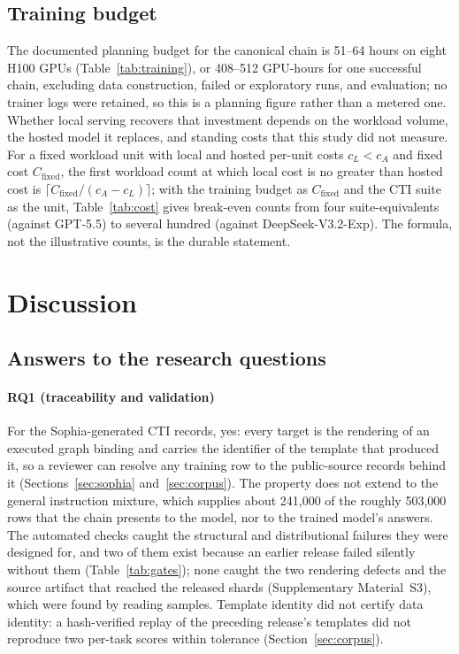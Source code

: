 \documentclass[a4paper,fleqn]{cas-dc}
\begin{document}
\subsection{Training budget}
The documented planning budget for the canonical chain is 51--64 hours on eight H100 GPUs (Table~\ref{tab:training}), or 408--512 GPU-hours for one successful chain, excluding data construction, failed or exploratory runs, and evaluation; no trainer logs were retained, so this is a planning figure rather than a metered one. Whether local serving recovers that investment depends on the workload volume, the hosted model it replaces, and standing costs that this study did not measure. For a fixed workload unit with local and hosted per-unit costs $c_L<c_A$ and fixed cost $C_{\mathrm{fixed}}$, the first workload count at which local cost is no greater than hosted cost is $\lceil C_{\mathrm{fixed}}/(c_A-c_L)\rceil$; with the training budget as $C_{\mathrm{fixed}}$ and the CTI suite as the unit, Table~\ref{tab:cost} gives break-even counts from four suite-equivalents (against GPT-5.5) to several hundred (against DeepSeek-V3.2-Exp). The formula, not the illustrative counts, is the durable statement.


\section{Discussion}\label{sec:discussion}
\subsection{Answers to the research questions}\label{sec:rqanswers}
\paragraph{RQ1 (traceability and validation)}
For the Sophia-generated CTI records, yes: every target is the rendering of an executed graph binding and carries the identifier of the template that produced it, so a reviewer can resolve any training row to the public-source records behind it (Sections~\ref{sec:sophia} and~\ref{sec:corpus}). The property does not extend to the general instruction mixture, which supplies about 241,000 of the roughly 503,000 rows that the chain presents to the model, nor to the trained model's answers. The automated checks caught the structural and distributional failures they were designed for, and two of them exist because an earlier release failed silently without them (Table~\ref{tab:gates}); none caught the two rendering defects and the source artifact that reached the released shards (Supplementary Material~S3), which were found by reading samples. Template identity did not certify data identity: a hash-verified replay of the preceding release's templates did not reproduce two per-task scores within tolerance (Section~\ref{sec:corpus}).
\end{document}

